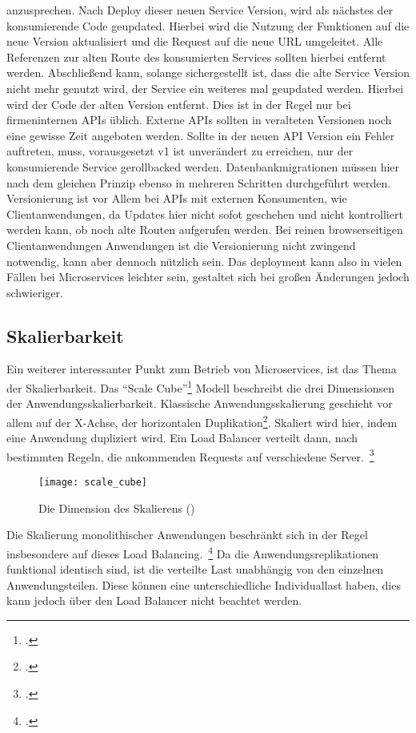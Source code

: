 \noindent anzusprechen. Nach Deploy dieser neuen Service Version, wird als nächstes der konsumierende Code geupdated. Hierbei wird die Nutzung der Funktionen auf die neue Version aktualisiert und die Request auf die neue URL umgeleitet. Alle Referenzen zur alten Route des konsumierten Services sollten hierbei entfernt werden. Abschließend kann, solange sichergestellt ist, dass die alte Service Version nicht mehr genutzt wird, der Service ein weiteres mal geupdated werden. Hierbei wird der Code der alten Version entfernt. Dies ist in der Regel nur bei firmeninternen APIs üblich. Externe APIs sollten in veralteten Versionen noch eine gewisse Zeit angeboten werden. Sollte in der neuen API Version ein Fehler auftreten, muss, vorausgesetzt v1 ist unverändert zu erreichen, nur der konsumierende Service gerollbacked werden.
Datenbankmigrationen müssen hier nach dem gleichen Prinzip ebenso in mehreren Schritten durchgeführt werden.
Versionierung ist vor Allem bei APIs mit externen Konsumenten, wie Clientanwendungen, da Updates hier nicht sofot geschehen und nicht kontrolliert werden kann, ob noch alte Routen aufgerufen werden. Bei reinen browserseitigen Clientanwendungen Anwendungen ist die Versionierung nicht zwingend notwendig, kann aber dennoch nützlich sein.
Das deployment kann also in vielen Fällen bei Microservices leichter sein, gestaltet sich bei großen Änderungen jedoch schwieriger.

\subsection{Skalierbarkeit}
Ein weiterer interessanter Punkt zum Betrieb von Microservices, ist das Thema der Skalierbarkeit.
Das ``Scale Cube''\footcite[][]{abbott2009art} Modell beschreibt die drei Dimensionsen der Anwendungsskalierbarkeit. Klassische Anwendungsskalierung geschieht vor allem auf der X-Achse, der horizontalen Duplikation\footcite[][]{abbott2009art}. Skaliert wird hier, indem eine Anwendung dupliziert wird. Ein Load Balancer verteilt dann, nach bestimmten Regeln, die ankommenden Requests auf verschiedene Server.~\footcite[vgl.][]{loadbalancing} 

\begin{figure}[!ht]
    \caption{Die Dimension des Skalierens (\cite{abbott2009art})}
    \label{fig:scalecube}
    \texttt{[image: scale\_cube]}
\end{figure}

Die Skalierung monolithischer Anwendungen beschränkt sich in der Regel insbesondere auf dieses Load Balancing.~\footcite[vgl.][]{infaktuell} 
Da die Anwendungsreplikationen funktional identisch sind, ist die verteilte Last unabhängig von den einzelnen Anwendungsteilen. Diese können eine unterschiedliche Individuallast haben, dies kann jedoch über den Load Balancer nicht beachtet werden.

